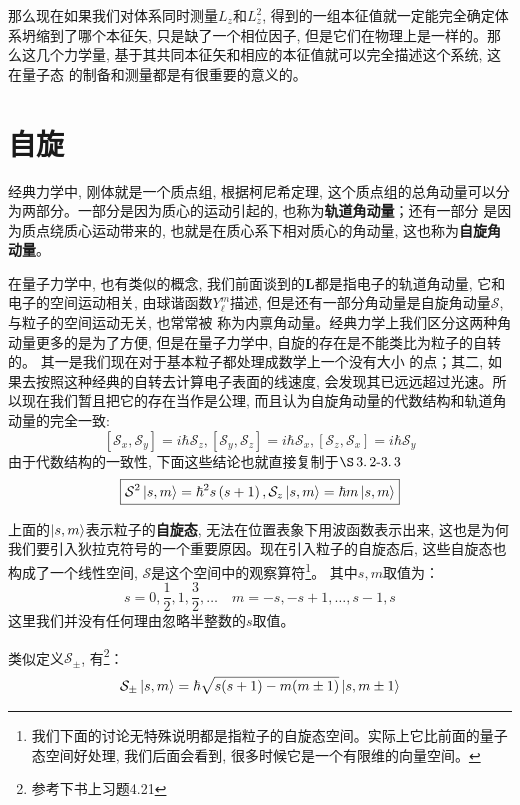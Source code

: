 \documentclass[a4paper,zihao=-4,linespread=1]{ctexrep}
\begin{document}
    那么现在如果我们对体系同时测量$L_z$和$L_z^2$, 得到的一组本征值就一定能完全确定体系坍缩到了哪个本征矢, 只是缺了一个相位因子, 但是它们在物理上是一样的。那么这几个力学量, 基于其共同本征矢和相应的本征值就可以完全描述这个系统, 这在量子态
    的制备和测量都是有很重要的意义的。

    \section{自旋}
    经典力学中, 刚体就是一个质点组, 根据柯尼希定理, 这个质点组的总角动量可以分为两部分。一部分是因为质心的运动引起的, 也称为\textbf{轨道角动量}；还有一部分
    是因为质点绕质心运动带来的, 也就是在质心系下相对质心的角动量, 这也称为\textbf{自旋角动量}。

    在量子力学中, 也有类似的概念, 我们前面谈到的$\bm{L}$都是指电子的轨道角动量, 它和电子的空间运动相关, 由球谐函数$Y_\ell^m$描述, 但是还有一部分角动量是自旋角动量$\mathcal{S}$, 与粒子的空间运动无关, 也常常被
    称为内禀角动量。经典力学上我们区分这两种角动量更多的是为了方便, 但是在量子力学中, 自旋的存在是不能类比为粒子的自转的。 其一是我们现在对于基本粒子都处理成数学上一个没有大小
    的点；其二, 如果去按照这种经典的自转去计算电子表面的线速度, 会发现其已远远超过光速。所以现在我们暂且把它的存在当作是公理, 而且认为自旋角动量的代数结构和轨道角动量的完全一致:
    \begin{equation}
        \boxed{\left[\mathcal{S}_x,\mathcal{S}_y\right]=i\hbar \mathcal{S}_z,\left[\mathcal{S}_y,\mathcal{S}_z\right]=i\hbar \mathcal{S}_x,\left[\mathcal{S}_z,\mathcal{S}_x\right]=i\hbar \mathcal{S}_y}
    \end{equation}
    由于代数结构的一致性, 下面这些结论也就直接复制于$\S \operatorname{3.2-3.3}$
    \begin{equation}
        \boxed{\mathcal{S}^2\ket{s,m}=\hbar^2s\left(s+1\right),\mathcal{S}_z\ket{s,m}=\hbar m\ket{s,m}}
    \end{equation}

    上面的$\ket{s,m}$表示粒子的\textbf{自旋态}, 无法在位置表象下用波函数表示出来, 这也是为何我们要引入狄拉克符号的一个重要原因。现在引入粒子的自旋态后, 这些自旋态也
    构成了一个线性空间, $\mathcal{S}$是这个空间中的观察算符\footnote{我们下面的讨论无特殊说明都是指粒子的自旋态空间。实际上它比前面的量子态空间好处理, 我们后面会看到, 很多时候它是一个有限维的向量空间。}。
    其中$s,m$取值为：
    \[s=0,\frac{1}{2},1,\frac{3}{2},\ldots\quad m=-s,-s+1,\ldots,s-1,s\]
    这里我们并没有任何理由忽略半整数的$s$取值。

    类似定义$\mathcal{S}_\pm$, 有\footnote{参考下书上习题4.21}：
    \begin{equation}
        \label{eq:4.60}
        \mathcal{S_\pm}\ket{s,m}=\hbar\sqrt{s(s+1)-m(m\pm 1)}\ket{s,m\pm 1}
    \end{equation}
\end{document}
